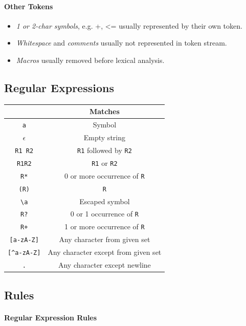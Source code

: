 \documentclass[twocolumn,english]{article}
\providecommand{\tabularnewline}{\\}
\providecommand{\tabularnewline}{\\}
\begin{document}
\paragraph{Other Tokens}
\begin{itemize}
\item \emph{1 or 2-char symbols}, e.g. +, \textless{}= usually represented
by their own token.
\item \emph{Whitespace} and \emph{comments} usually not represented in token
stream.
\item \emph{Macros} usually removed before lexical analysis.
\end{itemize}

\subsection{Regular Expressions}

\begin{table}[H]
\centering{}%
\begin{tabular}{cc}
\toprule 
 & \textbf{\footnotesize{}Matches}\tabularnewline
\midrule
\texttt{a} & {\footnotesize{}Symbol}\tabularnewline
$\epsilon$ & {\footnotesize{}Empty string}\tabularnewline
\texttt{R1 R2} & \texttt{\footnotesize{}R1}{\footnotesize{} followed by }\texttt{\footnotesize{}R2}\tabularnewline
\texttt{R1\textbar{}R2} & \texttt{\footnotesize{}R1}{\footnotesize{} or }\texttt{\footnotesize{}R2}\tabularnewline
\texttt{R{*}} & {\footnotesize{}0 or more occurrence of }\texttt{\footnotesize{}R}\tabularnewline
\texttt{(R)} & \texttt{\footnotesize{}R}\tabularnewline
\texttt{\textbackslash{}a} & {\footnotesize{}Escaped symbol}\tabularnewline
\midrule
\texttt{R?} & {\footnotesize{}0 or 1 occurrence of }\texttt{\footnotesize{}R}\tabularnewline
\texttt{R+} & {\footnotesize{}1 or more occurrence of }\texttt{\footnotesize{}R}\tabularnewline
\texttt{{[}a-zA-Z{]}} & {\footnotesize{}Any character from given set}\tabularnewline
\texttt{{[}\textasciicircum{}a-zA-Z{]}} & {\footnotesize{}Any character except from given set}\tabularnewline
\texttt{.} & {\footnotesize{}Any character except newline}\tabularnewline
\bottomrule
\end{tabular}
\end{table}


\subsection{Rules}

\paragraph{Regular Expression Rules}
\end{document}
